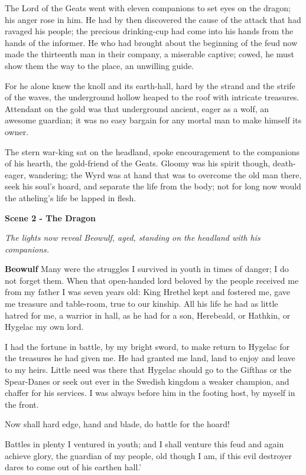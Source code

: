 \documentclass[a4paper]{article}
\begin{document}
{The Lord of the Geats went with eleven companions
to set eyes on the dragon; his anger rose in him.
He had by then discovered the cause of the attack
that had ravaged his people; the precious drinking-cup
had come into his hands from the hands of the informer.
He who had brought about the beginning of the feud
now made the thirteenth man in their company,
a miserable captive; cowed, he must show them
the way to the place, an unwilling guide.

For he alone knew the knoll and its earth-hall,
hard by the strand and the strife of the waves,
the underground hollow heaped to the roof
with intricate treasures. Attendant on the gold
was that underground ancient, eager as a wolf,
an awesome guardian; it was no easy bargain
for any mortal man to make himself its owner.

The stern war-king sat on the headland,
spoke encouragement to the companions of his hearth,
the gold-friend of the Geats. Gloomy was his spirit though,
death-eager, wandering; the Wyrd was at hand
that was to overcome the old man there,
seek his soul’s hoard, and separate
the life from the body; not for long now
would the atheling’s life be lapped in flesh.

\centerline{\textbf{Scene 2 - The Dragon}}

\centerline{\textit{The lights now reveal Beowulf, aged, standing on the headland with his companions.}}

\textbf{Beowulf} Many were the struggles I survived in youth
in times of danger; I do not forget them.
When that open-handed lord beloved by the people
received me from my father I was seven years old:
King Hrethel kept and fostered me,
gave me treasure and table-room, true to our kinship.
All his life he had as little hatred for me,
a warrior in hall, as he had for a son,
Herebeald, or Hathkin, or Hygelac my own lord.

I had the fortune in battle, by my bright sword,
to make return to Hygelac for the treasures he had given me.
He had granted me land, land to enjoy
and leave to my heirs. Little need was there
that Hygelac should go to the Gifthas or the Spear-Danes
or seek out ever in the Swedish kingdom
a weaker champion, and chaffer for his services.
I was always before him in the footing host,
by myself in the front.

Now shall hard edge,
hand and blade, do battle for the hoard!

Battles in plenty
I ventured in youth; and I shall venture this feud
and again achieve glory, the guardian of my people,
old though I am, if this evil destroyer
dares to come out of his earthen hall.’

}
\end{document}
